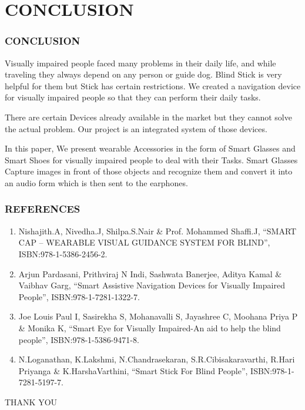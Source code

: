\documentclass[
	11pt, %
	t, %
	aspectratio=169, %
]{beamer}
\begin{document}
\section{CONCLUSION}
\begin{frame}
	\frametitle{CONCLUSION}
	Visually impaired people faced many problems in their daily life, and while traveling they always depend on any person or guide dog. Blind Stick is very helpful for them but Stick has certain restrictions. We created a navigation device for visually impaired people so that they can perform their daily tasks.
	
	\bigskip
	
	There are certain Devices already available in the market but they cannot solve the actual problem. Our project is an integrated system of those devices.
	
\bigskip

In this paper, We present wearable Accessories in the form of Smart Glasses and Smart Shoes for visually impaired people to deal with their Tasks. Smart Glasses Capture images in front of those objects and recognize them and convert it into an audio form which is then sent to the earphones.
\end{frame}
\begin{frame}
	\frametitle{REFERENCES}
\begin{enumerate}
	\item Nishajith.A, Nivedha.J, Shilpa.S.Nair \& Prof. Mohammed Shaffi.J, “SMART CAP – WEARABLE VISUAL GUIDANCE SYSTEM FOR BLIND”, ISBN:978-1-5386-2456-2.
\item Arjun Pardasani, Prithviraj N Indi, Sashwata Banerjee, Aditya Kamal \& Vaibhav Garg, “Smart Assistive Navigation Devices for Visually Impaired People”, ISBN:978-1-7281-1322-7.
\item Joe Louis Paul I, Sasirekha S, Mohanavalli S, Jayashree C, Moohana Priya P \& Monika K, “Smart Eye for Visually Impaired-An aid to help the blind people”, ISBN:978-1-5386-9471-8.
\item N.Loganathan, K.Lakshmi, N.Chandrasekaran, S.R.Cibisakaravarthi, R.Hari Priyanga \& K.HarshaVarthini, “Smart Stick For Blind People”, ISBN:978-1-7281-5197-7.
	\end{enumerate}
\end{frame}

\begin{frame}[plain] %
	\begin{center}
\vspace{3cm}
		{\Huge THANK YOU}
	\end{center}
\end{frame}

\end{document}
